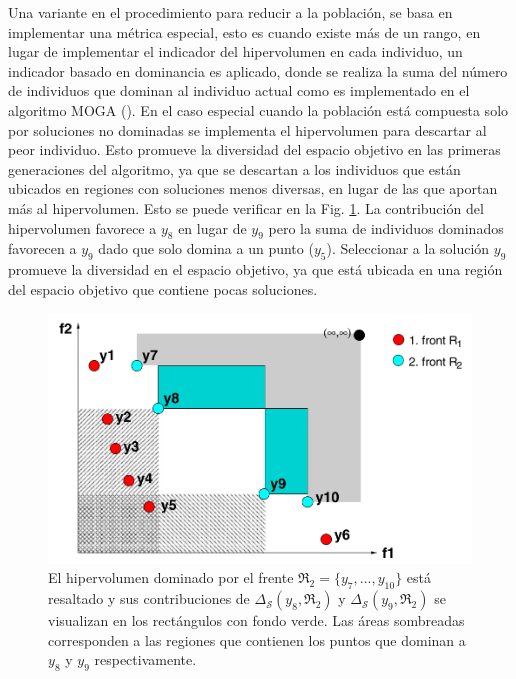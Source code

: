 Una variante en el procedimiento para reducir a la población, se basa en implementar una métrica especial, esto es cuando existe más de un rango, en lugar de implementar el indicador del hipervolumen en cada individuo, un indicador basado en dominancia es aplicado, donde se realiza la suma del número de individuos que dominan al individuo actual como es implementado en el algoritmo MOGA (\cite{Joel:MOGA}).
%
En el caso especial cuando la población está compuesta solo por soluciones no dominadas se implementa el hipervolumen para descartar al peor individuo.
%
Esto promueve la diversidad del espacio objetivo en las primeras generaciones del algoritmo, ya que se descartan a los individuos que están ubicados en regiones con soluciones menos diversas, en lugar de las que aportan más al hipervolumen.
%
Esto se puede verificar en la Fig. \ref{fig:SMS-EMOA-HV}.
%
La contribución del hipervolumen favorece a $y_8$ en lugar de $y_9$ pero la suma de individuos dominados favorecen a $y_9$ dado que solo domina a un punto ($y_5$). 
%
Seleccionar a la solución $y_9$ promueve la diversidad en el espacio objetivo, ya que está ubicada en una región del espacio objetivo que contiene pocas soluciones. 
\begin{figure}%
\centering
\scriptsize
\includegraphics[scale=0.2]
{Figures_Chapter2/SMSEMOA_Fronts.png}
\decoRule
\caption{El hipervolumen dominado por el frente $\Re_2 = \{ y_7, . . ., y_{10} \}$ est\'a resaltado y sus contribuciones de $\Delta_{\mathscr{S}}(y_8,\Re_2)$ y  $\Delta_{\mathscr{S}}(y_9,\Re_2)$ se visualizan en los rect\'angulos con fondo verde. Las \'areas sombreadas corresponden a las regiones que contienen los puntos que dominan a $y_8$ y $y_9$ respectivamente.}
\label{fig:SMS-EMOA-HV}
\end{figure}


